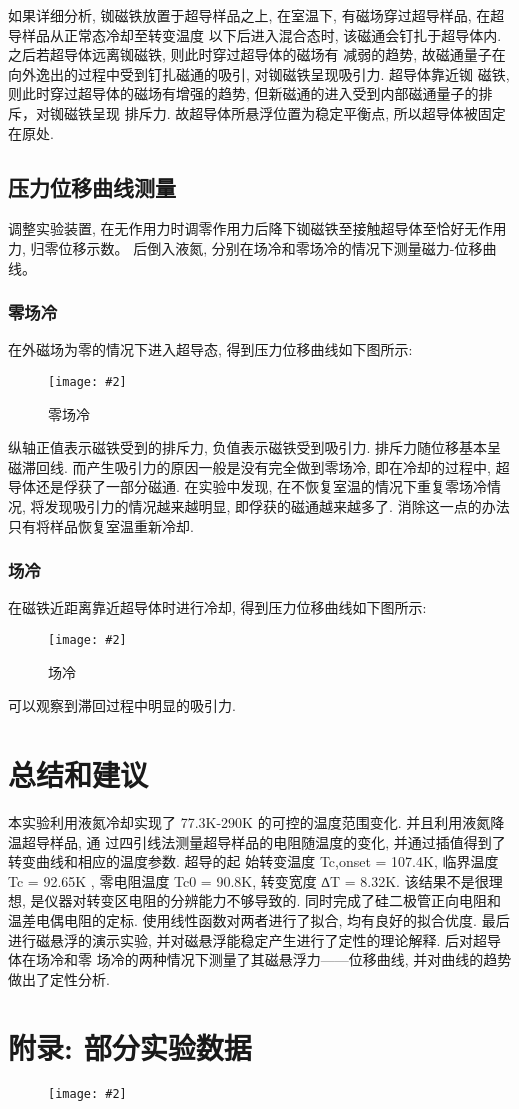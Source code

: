\documentclass[12pt,a4paper]{article}
\newcommand{\bfig}[3]{
    \begin{figure}[H]
        \centering
        \texttt{[image: \#2]}
        \caption{#3}
    \end{figure}
}
\begin{document}
如果详细分析, 铷磁铁放置于超导样品之上, 在室温下, 有磁场穿过超导样品, 在超导样品从正常态冷却至转变温度
以下后进入混合态时, 该磁通会钉扎于超导体内. 之后若超导体远离铷磁铁, 则此时穿过超导体的磁场有
减弱的趋势, 故磁通量子在向外逸出的过程中受到钉扎磁通的吸引, 对铷磁铁呈现吸引力. 超导体靠近铷
磁铁, 则此时穿过超导体的磁场有增强的趋势, 但新磁通的进入受到内部磁通量子的排斥，对铷磁铁呈现
排斥力. 故超导体所悬浮位置为稳定平衡点, 所以超导体被固定在原处. 
\subsection{压力位移曲线测量}
调整实验装置, 在无作用力时调零作用力后降下铷磁铁至接触超导体至恰好无作用力, 归零位移示数。
后倒入液氮, 分别在场冷和零场冷的情况下测量磁力-位移曲线。
\subsubsection{零场冷}
在外磁场为零的情况下进入超导态, 得到压力位移曲线如下图所示: 
\bfig{0.8}{zfc.png}{零场冷}
纵轴正值表示磁铁受到的排斥力, 负值表示磁铁受到吸引力. 排斥力随位移基本呈磁滞回线. 而产生吸引力的原因一般是没有完全做到零场冷, 即在冷却的过程中, 超导体还是俘获了一部分磁通.  
在实验中发现, 在不恢复室温的情况下重复零场冷情况, 将发现吸引力的情况越来越明显, 即俘获的磁通越来越多了. 消除这一点的办法只有将样品恢复室温重新冷却. 
\subsubsection{场冷}
在磁铁近距离靠近超导体时进行冷却, 得到压力位移曲线如下图所示: 
\bfig{0.8}{fc.png}{场冷}
可以观察到滞回过程中明显的吸引力. 
\section{总结和建议}
本实验利用液氮冷却实现了 77.3K-290K 的可控的温度范围变化. 并且利用液氮降温超导样品, 通
过四引线法测量超导样品的电阻随温度的变化, 并通过插值得到了转变曲线和相应的温度参数. 超导的起
始转变温度 Tc,onset = 107.4K, 临界温度 Tc = 92.65K , 零电阻温度 Tc0 = 90.8K, 转变宽度 ∆T = 8.32K. 该结果不是很理想, 是仪器对转变区电阻的分辨能力不够导致的. 
同时完成了硅二极管正向电阻和温差电偶电阻的定标. 使用线性函数对两者进行了拟合, 均有良好的拟合优度. 
最后进行磁悬浮的演示实验, 并对磁悬浮能稳定产生进行了定性的理论解释. 后对超导体在场冷和零
场冷的两种情况下测量了其磁悬浮力——位移曲线, 并对曲线的趋势做出了定性分析. 

\section{附录: 部分实验数据}
\bfig{0.3}{数据1.jpg}{}
\end{document}
